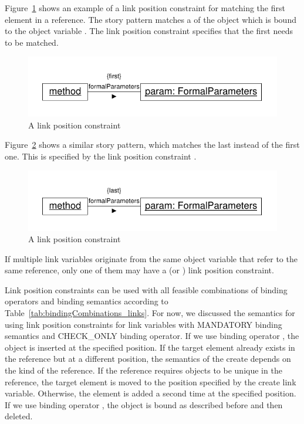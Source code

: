 {Figure~\ref{fig:linkPositionConstraintFirst} shows an example of a link position constraint for matching the first element in a reference. The story pattern matches a  of the object which is bound to the object variable . The link position constraint  specifies that the first  needs to be matched.

\begin{figure}[htbp]
\center
\includegraphics[width=0.75\columnwidth]{figures/LinkPositionConstraintFirst}
\caption{A  link position constraint}
\label{fig:linkPositionConstraintFirst}
\end{figure}

Figure~\ref{fig:linkPositionConstraintLast} shows a similar story pattern, which matches the last  instead of the first one. This is specified by the link position constraint .

\begin{figure}[htbp]
\center
\includegraphics[width=0.75\columnwidth]{figures/LinkPositionConstraintLast}
\caption{A  link position constraint}
\label{fig:linkPositionConstraintLast}
\end{figure}

If multiple link variables originate from the same object variable that refer to the same reference, only one of them may have a  (or ) link position constraint.

Link position constraints can be used with all feasible combinations of binding operators and binding semantics according to Table~\ref{tab:bindingCombinations_links}. For now, we discussed the semantics for using link position constraints for link variables with MANDATORY binding semantics and CHECK\_ONLY binding operator. If we use binding operator \create, the object is inserted at the specified position.
If the target element already exists in the reference but at a different position, the semantics of the create depends on the kind of the reference. 
If the reference requires objects to be unique in the reference, the target element is moved to the position specified by the create link variable. 
Otherwise, the element is added a second time at the specified position.
If we use binding operator \destroy, the object is bound as described before and then deleted.

}

